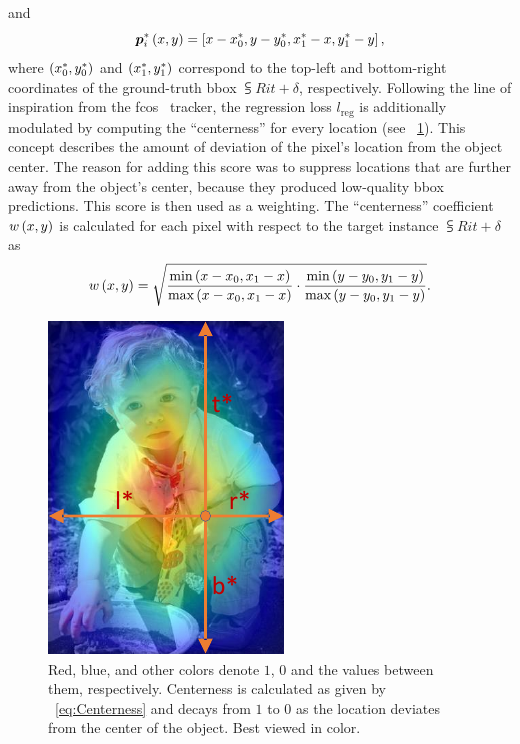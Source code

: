 and
\begin{equation}
    {\bm{p}_{i}^{*}} \left( x, y \right) =
    \left[ {
        x - {x}_{0}^{*},
        y - {y}_{0}^{*},
        {x}_{1}^{*} - x,
        {y}_{1}^{*} - y
    } \right],
\end{equation}
where $\left( {{x}_{0}^{*}, {y}_{0}^{*}} \right)$ and $\left( {{x}_{1}^{*}, {y}_{1}^{*}} \right)$ correspond to the top-left and bottom-right coordinates of the ground-truth \gls{bbox} $\subsup{R}{i}{t + \delta}$, respectively. Following the line of inspiration from the \gls{fcos}~\cite{tian2019fcos} tracker, the regression loss $l_{\text{reg}}$ is additionally modulated by computing the ``centerness'' for every location (see \figstr{}~\ref{fig:FCOSCenterness}). This concept describes the amount of deviation of the pixel's location from the object center. The reason for adding this score was to suppress locations that are further away from the object's center, because they produced low-quality \gls{bbox} predictions. This score is then used as a weighting. The ``centerness'' coefficient ${w} \left( x, y \right)$ is calculated for each pixel with respect to the target instance $\subsup{R}{i}{t + \delta}$ as
\begin{equation}
    \label{eq:Centerness}
    {w} \left( x, y \right) =
    \sqrt{
        \frac{\text{min} \left( x - x_0, x_1 - x \right)}{\text{max} \left( x - x_0, x_1 - x \right)}
        \cdot
        \frac{\text{min} \left( y - y_0, y_1 - y \right)}{\text{max} \left( y - y_0, y_1 - y \right)}
    }.
\end{equation}

\begin{figure}[t]
    \centerline{\includegraphics[width=0.2\linewidth]{figures/methodology/fcos_centerness.pdf}}
    \caption[Centerness visualization]{Red, blue, and other colors denote $1$, $0$ and the values between them, respectively. Centerness is calculated as given by \eqstr{}~\ref{eq:Centerness} and decays from $1$ to $0$ as the location deviates from the center of the object. Best viewed in color. }
    \label{fig:FCOSCenterness}
\end{figure}

